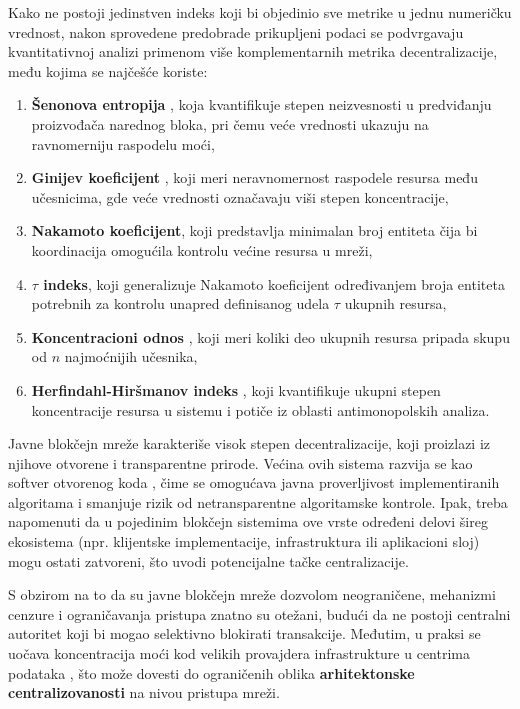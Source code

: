 Kako ne postoji jedinstven indeks koji bi objedinio sve metrike u jednu numeričku vrednost, nakon sprovedene predobrade prikupljeni podaci se podvrgavaju kvantitativnoj analizi primenom više komplementarnih metrika decentralizacije, među kojima se najčešće koriste:
\begin{enumerate}
\item \textbf{Šenonova entropija} \cite{shannon1948mathematical}, koja kvantifikuje stepen neizvesnosti u predviđanju proizvođača narednog bloka, pri čemu veće vrednosti ukazuju na ravnomerniju raspodelu moći,
\item \textbf{Ginijev koeficijent} \cite{gini1921measurement}, koji meri neravnomernost raspodele resursa među učesnicima, gde veće vrednosti označavaju viši stepen koncentracije,
\item \textbf{Nakamoto koeficijent}, koji predstavlja minimalan broj entiteta čija bi koordinacija omogućila kontrolu većine resursa u mreži,
\item \textbf{$\tau$ indeks}, koji generalizuje Nakamoto koeficijent određivanjem broja entiteta potrebnih za kontrolu unapred definisanog udela $\tau$ ukupnih resursa,
\item \textbf{Koncentracioni odnos} \cite{shepherd1987concentration}, koji meri koliki deo ukupnih resursa pripada skupu od $n$ najmoćnijih učesnika,
\item \textbf{Herfindahl-Hiršmanov indeks} \cite{rhoades1993herfindahl}, koji kvantifikuje ukupni stepen koncentracije resursa u sistemu i potiče iz oblasti antimonopolskih analiza.
\end{enumerate}

Javne blokčejn mreže karakteriše visok stepen decentralizacije, koji proizlazi iz njihove otvorene i transparentne prirode. Većina ovih sistema razvija se kao softver otvorenog koda , čime se omogućava javna proverljivost implementiranih algoritama i smanjuje rizik od netransparentne algoritamske kontrole. Ipak, treba napomenuti da u pojedinim blokčejn sistemima ove vrste određeni delovi šireg ekosistema (npr. klijentske implementacije, infrastruktura ili aplikacioni sloj) mogu ostati zatvoreni, što uvodi potencijalne tačke centralizacije.

S obzirom na to da su javne blokčejn mreže dozvolom neograničene, mehanizmi cenzure i ograničavanja pristupa znatno su otežani, budući da ne postoji centralni autoritet koji bi mogao selektivno blokirati transakcije. Međutim, u praksi se uočava koncentracija moći kod velikih provajdera infrastrukture u centrima podataka  \cite{gencer2018decentralization}, što može dovesti do ograničenih oblika \textbf{arhitektonske centralizovanosti} na nivou pristupa mreži.

